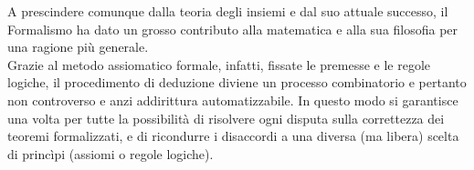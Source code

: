 A prescindere comunque dalla teoria degli insiemi e dal suo attuale successo, il Formalismo ha dato un grosso contributo alla matematica e alla sua filosofia per una ragione più generale.\\
Grazie al metodo assiomatico formale, infatti, fissate le premesse e le regole logiche, il procedimento di deduzione diviene un processo combinatorio e pertanto non controverso e anzi addirittura automatizzabile. In questo modo si garantisce una volta per tutte la possibilità di risolvere ogni disputa sulla correttezza dei teoremi formalizzati, e di ricondurre i disaccordi a una diversa (ma libera) scelta di princìpi (assiomi o regole logiche). 

